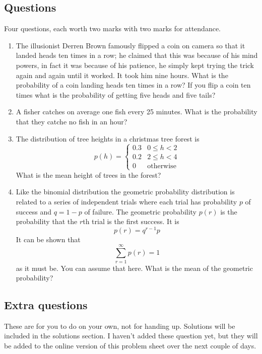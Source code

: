 \documentclass[11pt,a4paper]{scrartcl}
\begin{document}
\subsection*{Questions}

Four questions, each worth two marks with two marks for attendance.

\begin{enumerate}

\item The illusionist Derren Brown famously flipped a coin on camera
  so that it landed heads ten times in a row; he claimed that this was
  because of his mind powers, in fact it was because of his patience,
  he simply kept trying the trick again and again until it
  worked. It took him nine hours. What is the probability of a coin landing heads ten times in
  a row? If you flip a coin ten times what is the probability of
  getting five heads and five tails?

\item A fisher catches on average one fish every 25 minutes. What is
  the probability that they catche no fish in an hour?

\item The distribution of tree heights in a christmas tree forest is 
\begin{equation}
p(h)=\left\{\begin{array}{cc}0.3& 0\le h <2\\0.2& 2\le h<4\\0&\mbox{otherwise}\end{array}\right.
\end{equation}
What is the mean height of trees in the forest?

\item Like the binomial distribution the geometric probability
  distribution is related to a series of independent trials where each
  trial has probability $p$ of success and $q=1-p$ of failure. The
  geometric probability $p(r)$ is the probability that the $r$th trial
  is the first success. It is
\begin{equation}
p(r)=q^{r-1}p
\end{equation}
It can be shown that 
\begin{equation}
\sum_{r=1}^\infty p(r)=1
\end{equation}
as it must be. You can assume that here. What is the mean of the geometric probability?

\end{enumerate}

\subsection*{Extra questions}

These are for you to do on your own, not for handing up. Solutions will be included in the solutions section. I haven't added these question yet, but they will be added to the online version of this problem sheet over the next couple of days.
\end{document}
